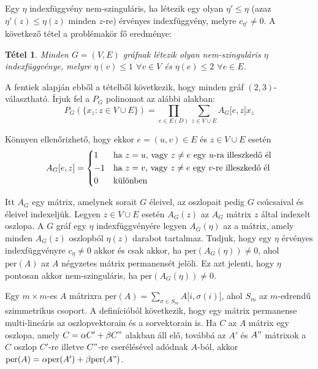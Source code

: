 \documentclass[12pt, a4paper]{report}
\newtheorem{tét}{Tétel}[section]
\theoremstyle{remark}
\theoremstyle{definition}
\begin{document}
Egy $\eta$ indexfüggvény nem-szinguláris, ha létezik egy olyan $\eta' \leq \eta$ (azaz $\eta'(z) \leq \eta(z)$ minden $z$-re) érvényes indexfüggvény, melyre $c_{\eta'} \neq 0$. A következő tétel a problémakör fő eredménye:

\begin{tét}
Minden $G = (V, E)$ gráfnak létezik olyan nem-szinguláris $\eta$ indexfüggvénye, melyre $\eta(v) \leq 1$ $\forall v \in V$ és $\eta(e) \leq 2$ $\forall e \in E$.
\end{tét}

A fentiek alapján ebből a tételből következik, hogy minden gráf $(2, 3)$-választható. Írjuk fel a $P_G$ polinomot az alábbi alakban:
\begin{equation}
P_G(\lbrace x_z: z \in V \cup E \rbrace) = \prod_{e \in E(D)} \sum_{z \in V \cup E} A_G \lbrack e, z \rbrack x_z
\end{equation}

Könnyen ellenőrizhető, hogy ekkor $e = (u, v) \in E$ és $z \in V \cup E$ esetén
\begin{equation}
A_G \lbrack e, z \rbrack = 
    \begin{dcases*}
    1 & ha $z = u$, vagy $z \neq e$ egy $u$-ra illeszkedő él\\
    -1 & ha $z = v$, vagy $z \neq e$ egy $v$-re illeszkedő él\\
    0 & különben
    \end{dcases*}
\end{equation}

Itt $A_G$ egy mátrix, amelynek sorait $G$ éleivel, az oszlopait pedig $G$ csúcsaival és éleivel indexeljük. Legyen $z \in V \cup E$ esetén $A_G(z)$ az $A_G$ mátrix $z$ által indexelt oszlopa. A $G$ gráf egy $\eta$ indexfüggvényére legyen $A_G(\eta)$ az a mátrix, amely minden $A_G(z)$ oszlopból $\eta(z)$ darabot tartalmaz. Tudjuk, hogy egy $\eta$ érvényes indexfüggvényre $c_{\eta} \neq 0$ akkor és csak akkor, ha $\mathrm{per}(A_G(\eta)) \neq 0$, ahol $\mathrm{per}(A)$ az $A$ négyzetes mátrix permanensét jelöli. Ez azt jelenti, hogy $\eta$ pontosan akkor nem-szinguláris, ha $\mathrm{per}(A_G(\eta)) \neq 0$.

Egy $m \times m$-es $A$ mátrixra $\mathrm{per}(A) = \sum\limits_{\sigma \in S_m} A \lbrack i, \sigma(i) \rbrack$, ahol $S_m$ az $m$-edrendű szimmetrikus csoport. A definícióból következik, hogy egy mátrix permanense multi-lineáris az oszlopvektorain és a sorvektorain is. Ha $C$ az $A$ mátrix egy oszlopa, amely $C = \alpha C' + \beta C"$ alakban áll elő, továbbá az $A'$ és $A"$ mátrixok a $C$ oszlop $C'$-re illetve $C"$-re cserélésével adódnak $A$-ból, akkor $\mathrm{per}(A) = \alpha \mathrm{per}(A') + \beta \mathrm{per}(A")$.
\end{document}
